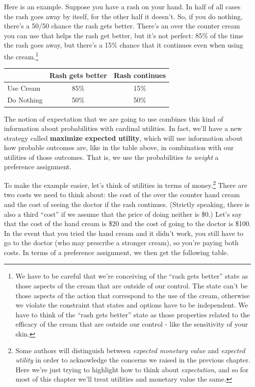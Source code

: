 \documentclass[]{tufte-book}
\begin{document}
Here is an example. Suppose you have a rash on your hand. In half of all cases the rash goes away by itself, for the other half it doesn't. So, if you do nothing, there's a 50/50 chance the rash gets better. There's an over the counter cream you can use that helps the rash get better, but it's not perfect: 85\% of the time the rash goes away, but there's a 15\% chance that it continues even when using the cream.\footnote{We have to be careful that we're conceiving of the ``rash gets better'' state as those aspects of the cream that are outside of our control. The state can't be those aspects of the action that correspond to the use of the cream, otherwise we violate the constraint that states and options have to be independent. We have to think of the ``rash gets better'' state as those properties related to the efficacy of the cream that are outside our control - like the sensitivity of your skin.}

\begin{longtable}[]{@{}lcc@{}}
\toprule
& Rash gets better & Rash continues\tabularnewline
\midrule
\endhead
Use Cream & 85\% & 15\%\tabularnewline
Do Nothing & 50\% & 50\%\tabularnewline
\bottomrule
\end{longtable}

The notion of expectation that we are going to use combines this kind of information about probabilities with cardinal utilities. In fact, we'll have a new strategy called \textbf{maximize expected utility}, which will use information about how probable outcomes are, like in the table above, in combination with our utilities of those outcomes. That is, we use the probabilities \emph{to weight} a preference assignment.

To make the example easier, let's think of utilities in terms of money.\footnote{Some authors will distinguish between \emph{expected monetary value} and \emph{expected utility} in order to acknowledge the concerns we raised in the previous chapter. Here we're just trying to highlight how to think about \emph{expectation}, and so for most of this chapter we'll treat utilities and monetary value the same.} There are two costs we need to think about: the cost of the over the counter hand cream and the cost of seeing the doctor if the rash continues. (Strictly speaking, there is also a third ``cost'' if we assume that the price of doing neither is \$0.) Let's say that the cost of the hand cream is \$20 and the cost of going to the doctor is \$100. In the event that you tried the hand cream and it didn't work, you still have to go to the doctor (who may prescribe a stronger cream), so you're paying both costs. In terms of a preference assignment, we then get the following table.
\end{document}
